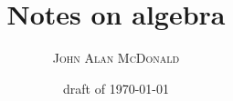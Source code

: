 \documentclass[10pt,openany]{book}
\title{Notes on algebra}
\author{\textsc{John Alan McDonald}}
\date{draft of \today}
\begin{document}
\maketitle

\frontmatter

\begingroup
\let\onecolumn\twocolumn
\sffamily
\tableofcontents
\rmfamily
\endgroup

\mainmatter



\appendix

\backmatter



\end{document}
